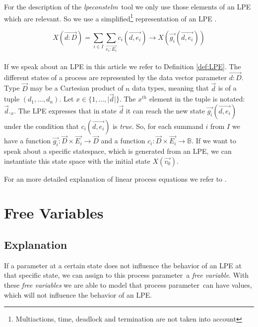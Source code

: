 \index{}\documentclass[a4paper,10pt]{article}
\theoremstyle{plain}
\theoremstyle{definition}
\newcommand{\lpe}{linear process equation}
\newcommand{\tool}{\textit{lpeconstelm}}
\newcommand{\ovr}{\overrightarrow}
\newcommand{\pp}{process parameter}
\newcommand{\ti}{\textit}
\begin{document}
\noindent For the description of the \tool\ tool we only use those elements of an LPE which are relevant. So we use a simplified\footnote{Multiactions, time, deadlock and termination are not taken into account} representation of an LPE .
\begin{defn}\label{def:LPE}
\begin{displaymath}
X (\ovr{d:D}) = \sum_{i \in I} \sum_{\ovr{e_i:E_i}} c_i ( \ovr{d, e_i}) \rightarrow X(\ovr{g_i}(\ovr{d,e_i}))
\end{displaymath}\\
If we speak about an LPE in this article we refer to Definition \ref{def:LPE}.  The different states 
of a process are represented by the data vector parameter $\ovr{d: D}$. Type $\ovr{D}$ may be a Cartesian product of $n$ data types, meaning that $\ovr{d}$ is of a tuple $(d_1, \ldots, d_n)$. 
Let $x \in \lbrace 1, \ldots , \vert \ovr{d} \vert \rbrace$. The $x^{th}$ element in the tuple is notated: $\ovr{d}._x$.
The LPE expresses that in state $\ovr{d}$ %
it can reach the new state $\ovr{g_i}(\ovr{d,e_i})$ under the condition that $c_i(\ovr{d,e_i})$ is \ti{true}. So, for each summand $i$ from $I$ we have a function $\ovr{g_i}: \ovr{D} \times \ovr{E_i} \rightarrow \ovr{D}$ and a function $c_i: \ovr{D} \times \ovr{E_i} \rightarrow \mathbb{B}$.
If we want to speak about a specific statespace, which is generated from an LPE, we can instantiate this state space with the initial state $X(\ovr{v_0})$. 

\noindent For an more detailed explanation of \lpe s  we refer to \cite{LPE_info}.
\end{defn}

\section{Free Variables}
\subsection{Explanation}

If a parameter at a certain state does not influence the behavior of an LPE at that specific state, we can assign to this \pp\ a \ti{free variable}. With these \ti{free variables} we are able to model that \pp\ can have values, which will not influence the behavior of an LPE.
\end{document}
